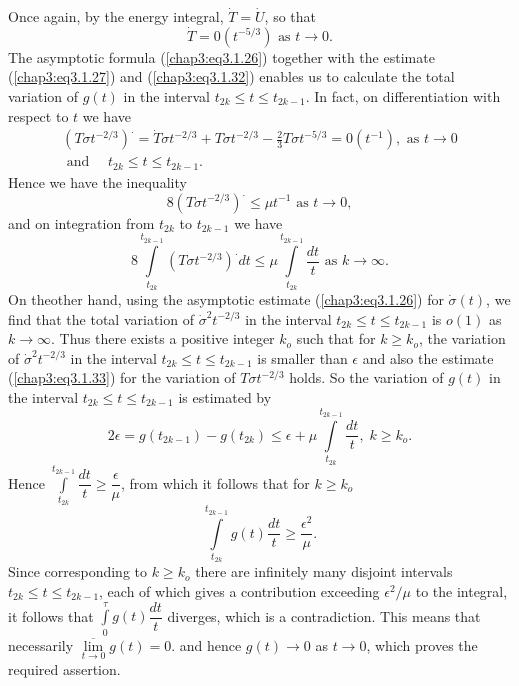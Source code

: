 Once again, by the energy integral, $\dot{T} = \dot{U}$, so that
\begin{equation*}
\dot{T} = 0 (t^{-5/3}) \text{ as } t \to
0. \tag{3.1.32}\label{chap3:eq3.1.32} 
\end{equation*}
The asymptotic formula (\ref{chap3:eq3.1.26}) together with the
estimate (\ref{chap3:eq3.1.27}) 
and (\ref{chap3:eq3.1.32}) enables us to calculate the total variation
of $g(t)$ in 
the interval $t_{2k} \leq t \leq t_{2k-1}$. In fact, on
differentiation with respect to $t$ we have
\begin{gather*}
(T \sigma t^{-2/3})^. = \dot{T} \sigma t^{-2/3} + T \dot{\sigma}
  t^{-2/3} - \frac{2}{3} T \sigma t^{-5/3} = 0 (t^{-1}), \text{ as } t
  \to  0\\
\text{ and } \quad t_{2k} \leq t \leq t_{2k -1}.
\end{gather*}
Hence we have the inequality
$$
8 (T \sigma t^{-2/3})^. \leq \mu t^{-1} \text{ as } t \to 0,
$$
and on integration from $t_{2k}$ to $t_{2k-1}$ we have 
\begin{equation*}
8 \int\limits^{t_{2k-1}}_{t_{2k}}  (T \sigma t^{-2/3})^. dt \leq \mu
\int\limits^{t_{2k-1}}_{t_{2k}} \frac{dt}{t} \text{ as } k \to
\infty.  \tag{3.1.33}\label{chap3:eq3.1.33}
\end{equation*}
On the\pageoriginale other hand, using the asymptotic estimate
(\ref{chap3:eq3.1.26}) for $\dot{\sigma} (t)$, we find that the total
variation of $\dot{\sigma}^2 t^{-2/3}$ in the interval $t_{2k} \leq t
\leq t_{2k-1}$ is $o(1)$ as $k \to \infty$. Thus there exists a
positive integer $k_o$ such that for $k \geq k_o$, the variation of
$\dot{\sigma}^2 t^{-2/3}$ in the interval $t_{2k} \leq t \leq t_{2k
  -1}$ is smaller than $\epsilon$ and also the estimate
(\ref{chap3:eq3.1.33}) for the variation of $T \sigma t^{-2/3}$
holds. So the  variation of $g(t)$ in the interval $t_{2k} \leq t \leq
t_{2k-1}$ is estimated by 
$$
2 \epsilon = g(t_{2k-1}) -g (t_{2k}) \leq \epsilon + \mu
\int\limits^{t_{2k-1}}_{t_{2k}} \frac{dt}{t}, \; k \geq k_o.  
$$
Hence $\int\limits^{t_{2k -1}}_{t_{2k}} \dfrac{dt}{t} \geq
\dfrac{\epsilon}{\mu}$, from which it follows that for $k \geq k_o$ 
$$
\int\limits^{t_{2k-1}}_{t_{2k}} g(t) \dfrac{dt}{t} \geq \frac{\epsilon^2}{\mu}. 
$$
Since corresponding to $k \geq k_o$ there are infinitely many disjoint
intervals $t_{2k} \leq t \leq t_{2k -1}$, each of which gives a
contribution exceeding $\epsilon^2 / \mu$ to the integral, it follows
that $\int\limits^\tau_0 g(t) \dfrac{dt}{t}$ diverges, which is a
contradiction. This means that necessarily $\overline{\lim\limits_{t
    \to 0}} g(t) = 0$. and hence $g(t) \to 0$ as $t \to 0$, which
proves the required assertion.  

